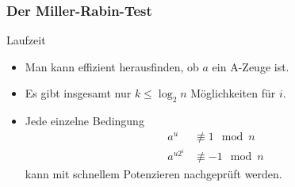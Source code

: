 \documentclass{beamer}
\renewcommand{\oe}{\"o}
\newcommand{\ue}{\"u}
\begin{document}
\begin{frame}\frametitle{Der Miller-Rabin-Test}
	\begin{block}{Laufzeit}
		\begin{itemize}
			\item Man kann effizient herausfinden, ob $a$ ein A-Zeuge ist.
			\item Es gibt insgesamt nur $k\leq\log_2n$ M\oe glichkeiten f\ue r $i$.
			\item Jede einzelne Bedingung 
				\begin{align*}
					a^{u}&\not\equiv1\mod n\\
					a^{u2^i}&\not\equiv-1\mod n
				\end{align*}
				kann mit schnellem Potenzieren nachgepr\ue ft werden.
		\end{itemize}
	\end{block}
\end{frame}
\end{document}

